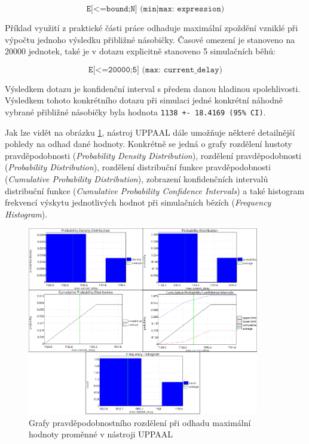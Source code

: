 \begin{equation*}
    \texttt{E[<=bound;N] (min|max: expression)}
\end{equation*}

Příklad využití z praktické části práce odhaduje maximální zpoždění vzniklé při výpočtu jednoho výsledku přibližné násobičky. Časové omezení je stanoveno na 20000 jednotek, také je v dotazu explicitně stanoveno 5 simulačních běhů:

\begin{equation*}
    \texttt{E[<=20000;5] (max: current\_delay)}
\end{equation*}

Výsledkem dotazu je konfidenční interval s předem danou hladinou spolehlivosti. Výsledkem tohoto konkrétního dotazu při simulaci jedné konkrétní náhodně vybrané přibližné násobičky byla hodnota \texttt{1138 +- 18.4169 (95\% CI)}. 

Jak lze vidět na obrázku \ref{fig:prob_plots}, nástroj UPPAAL dále umožňuje některé detailnější pohledy na odhad dané hodnoty. Konkrétně se jedná o grafy rozdělení hustoty pravděpodobnosti (\textit{Probability Density Distribution}), rozdělení pravděpodobnosti (\textit{Probability Distribution}), rozdělení distribuční funkce pravděpodobnosti (\textit{Cumulative Probability Distribution}), zobrazení konfidenčních intervalů distribuční funkce (\textit{Cumulative Probability Confidence Intervals}) a také histogram frekvencí výskytu jednotlivých hodnot při simulačních bězích (\textit{Frequency Histogram}).

\begin{figure}[H]
    \centering
    \includegraphics[width=0.9\textwidth]{obrazky-figures/prob_plots.png}
    \caption{Grafy pravděpodobnostního rozdělení při odhadu maximální hodnoty proměnné v nástroji UPPAAL}
    \label{fig:prob_plots}
\end{figure}


